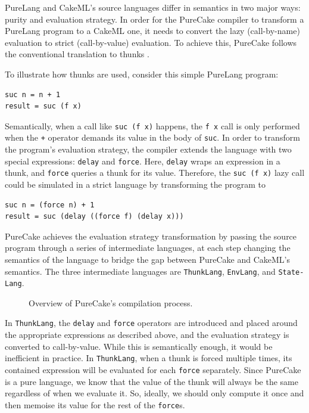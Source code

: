 \documentclass[sigconf]{acmart}
\newcommand{\hsinl}[1]{\texttt{#1}}
\newcommand{\code}[1]{\texttt{#1}}
\newcommand{\ThunkLang}{\code{ThunkLang}}
\newcommand{\EnvLang}{\code{EnvLang}}
\begin{document}
PureLang and CakeML's source languages differ in semantics in two major ways:
purity and evaluation strategy. In order for the PureCake compiler to transform
a PureLang program to a CakeML one, it needs to convert the lazy (call-by-name)
evaluation to strict (call-by-value) evaluation. To achieve this, PureCake
follows the conventional translation to thunks \cite{ImplementationOfFunctional}.

To illustrate how thunks are used, consider this simple PureLang program:
\begin{verbatim}
suc n = n + 1
result = suc (f x)
\end{verbatim}
Semantically, when a call like \hsinl{suc (f
x)} happens, the \code{f x} call is only performed when the \code{+} operator
demands its value in the body of \hsinl{suc}. In order to transform the
program's evaluation strategy, the compiler extends the language with two
special expressions: \code{delay} and \code{force}. Here, \code{delay} wraps an
expression in a thunk, and \code{force} queries a thunk for its value.
Therefore, the \hsinl{suc (f x)} lazy call could be simulated in a strict
language by transforming the program to
\begin{verbatim}
suc n = (force n) + 1
result = suc (delay ((force f) (delay x)))
\end{verbatim}

PureCake achieves the evaluation strategy transformation by passing the source
program through a series of intermediate languages, at each step changing the
semantics of the language to bridge the gap between PureCake and CakeML's
semantics. The three intermediate languages are \ThunkLang{}, \EnvLang{}, and
\texttt{State-\allowbreak Lang}.
\begin{figure}[h]
  \centering
  
  \caption{Overview of PureCake's compilation process.}
  \label{fig:comp-process-pure}
\end{figure}

In \ThunkLang{}, the \code{delay} and \code{force} operators are introduced and
placed around the appropriate expressions as described above, and the evaluation
strategy is converted to call-by-value. While this is semantically enough, it
would be inefficient in practice. In \ThunkLang{}, when a thunk is forced
multiple times, its contained expression will be evaluated for each \code{force}
separately. Since PureCake is a pure language, we know that the value of the
thunk will always be the same regardless of when we evaluate it. So, ideally, we
should only compute it once and then memoise its value for the rest of the
\code{force}s.
\end{document}
